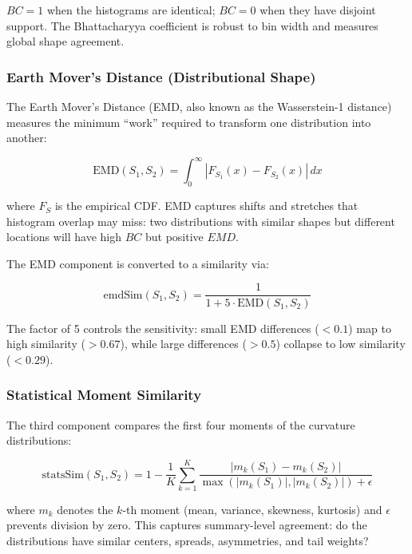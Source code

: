 \documentclass{../yalumba}
\begin{document}
$BC = 1$ when the histograms are identical; $BC = 0$ when they have
disjoint support.  The Bhattacharyya coefficient is robust to bin width
and measures global shape agreement.

\subsubsection{Earth Mover's Distance (Distributional Shape)}

The Earth Mover's Distance (EMD, also known as the Wasserstein-1 distance)
measures the minimum ``work'' required to transform one distribution into
another:

\begin{equation}
  \text{EMD}(S_1, S_2) = \int_0^\infty |F_{S_1}(x) - F_{S_2}(x)|\, dx
  \label{eq:emd}
\end{equation}

where $F_S$ is the empirical CDF.  EMD captures shifts and stretches that
histogram overlap may miss: two distributions with similar shapes but
different locations will have high $BC$ but positive $EMD$.

The EMD component is converted to a similarity via:

\begin{equation}
  \text{emdSim}(S_1, S_2) = \frac{1}{1 + 5 \cdot \text{EMD}(S_1, S_2)}
  \label{eq:emd-sim}
\end{equation}

The factor of 5 controls the sensitivity: small EMD differences ($< 0.1$)
map to high similarity ($> 0.67$), while large differences ($> 0.5$)
collapse to low similarity ($< 0.29$).

\subsubsection{Statistical Moment Similarity}

The third component compares the first four moments of the curvature
distributions:

\begin{equation}
  \text{statsSim}(S_1, S_2) = 1 - \frac{1}{K}
    \sum_{k=1}^{K} \frac{|m_k(S_1) - m_k(S_2)|}
                         {\max(|m_k(S_1)|, |m_k(S_2)|) + \epsilon}
  \label{eq:stats-sim}
\end{equation}

where $m_k$ denotes the $k$-th moment (mean, variance, skewness, kurtosis)
and $\epsilon$ prevents division by zero.  This captures summary-level
agreement: do the distributions have similar centers, spreads, asymmetries,
and tail weights?
\end{document}
